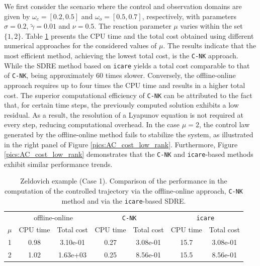 \documentclass{article}
\begin{document}
We first consider the scenario where the control and observation domains are given by $\omega_c= [0.2,0.5] $ and $ \omega_o = [0.5,0.7]$, respectively, with parameters $\sigma = 0.2$, $\tilde{\gamma} = 0.01$ and $\nu = 0.5$. The reaction parameter $\mu$ varies within the set $\{1,2\}$. Table \ref{table_AC_low_rank} presents the CPU time and the total cost obtained using different numerical approaches for the considered values of $\mu$. The results indicate that the most efficient method, achieving the lowest total cost, is the \texttt{C-NK} approach. While the SDRE method based on \texttt{icare} yields a total cost comparable to that of \texttt{C-NK}, being approximately 60 times slower. Conversely, the offline-online approach requires up to four times the CPU time and results in a higher total cost.  The superior computational efficiency of \texttt{C-NK} can be attributed to the fact that, for certain time steps, the previously computed solution exhibits a low residual. As a result, the resolution of a Lyapunov equation is not required at every step, reducing computational overhead.
In the case $\mu=2$, the control law generated by the offline-online method fails to stabilize the system, as illustrated in the right panel of Figure \ref{pics:AC_cost_low_rank}.
Furthermore, Figure \ref{pics:AC_cost_low_rank} demonstrates that the \texttt{C-NK} and \texttt{icare}-based methods exhibit similar performance trends.


\begin{table}[hbht]
\centering
\begin{tabular}{c|cc|cc|cc}    

        & \multicolumn{2}{c|}{offline-online}   & \multicolumn{2}{c|}{\texttt{C-NK}} & \multicolumn{2}{c}{\texttt{icare}} \\
$\mu$   & CPU time & Total cost & CPU time & Total cost & CPU time & Total cost 
\\\hline
1    & 0.98  &   3.10e-01 & 0.27   &  3.08e-01  &  15.7 & 3.08e-01\\

2 & 1.02  &   1.63e+03  & 0.25   &  8.56e-01   &  15.5 & 8.56e-01  \\
 \end{tabular}
  \caption{Zeldovich example (Case 1). Comparison of the performance in the computation of the controlled trajectory via the offline-online approach, \texttt{C-NK} method and via the \texttt{icare}-based SDRE.}
 \label{table_AC_low_rank}
\end{table}
\end{document}
